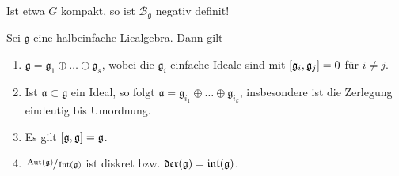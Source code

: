 Ist etwa $G$ kompakt, so ist $\mathcal{B}_\mathfrak{g}$ negativ definit!

\begin{satz}[label=satz:222,{name=[Eigenschaften halbeinfacher Liealgebren]}]
	Sei $\mathfrak{g}$ eine halbeinfache Liealgebra.
	Dann gilt
	\begin{enumerate}[1)]
		\item $\mathfrak{g} = \mathfrak{g}_1 \oplus  \ldots \oplus \mathfrak{g}_s$, wobei die $\mathfrak{g}_i$ einfache Ideale sind mit $\benbrace*{\mathfrak{g}_i,\mathfrak{g}_j}=0$ für $i \neq j$.
		\item Ist $\mathfrak{a} \subset \mathfrak{g}$ ein Ideal, so folgt $\mathfrak{a} = \mathfrak{g}_{i_1} \oplus  \ldots \oplus \mathfrak{g}_{i_k}$, insbesondere ist die Zerlegung eindeutig bis Umordnung.
		\item Es gilt $\benbrace*{\mathfrak{g},\mathfrak{g}}=\mathfrak{g}$.
		\item $\sfrac{\Aut(\mathfrak{g})}{\Int(\mathfrak{g})}$ ist diskret bzw. $\Der(\mathfrak{g}) = \intAlg(\mathfrak{g})$.
	\end{enumerate}
\end{satz}
